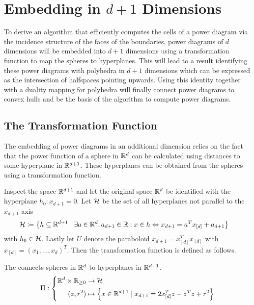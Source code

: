 \section{Embedding in \texorpdfstring{$d+1$}{d+1} Dimensions}
\label{sec:embedding_in_d_1_dimensions}
To derive an algorithm that efficiently computes the cells of a power diagram via the incidence structure of the faces of the boundaries, power diagrams of $d$ dimensions will be embedded into $d+1$ dimensions using a transformation function to map the spheres to hyperplanes.
This will lead to a result identifying these power diagrams with polyhedra in $d+1$ dimensions which can be expressed as the intersection of halfspaces pointing upwards.
Using this identity together with a duality mapping for polyhedra will finally connect power diagrams to convex hulls and be the basis of the algorithm to compute power diagrams.

\subsection{The Transformation Function}
\label{sub:the_transform}
The embedding of power diagrams in an additional dimension relies on the fact that the power function of a sphere in $\mathbb{R}^d$ can be calculated using distances to some hyperplane in $\mathbb{R}^{d+1}$.
These hyperplanes can be obtained from the spheres using a transformation function.

Inspect the space $\mathbb{R}^{d+1}$ and let the original space $\mathbb{R}^d$ be identified with the hyperplane $h_0: x_{d+1} = 0$.
Let $\mathcal{H}$ be the set of all hyperplanes not parallel to the $x_{d+1}$ axis
\begin{align}
    \mathcal{H} &\coloneqq \left\{ h \subseteq \mathbb{R}^{d+1} \mid \exists a \in \mathbb{R}^d, a_{d+1} \in \mathbb{R} : x \in h \Leftrightarrow x_{d+1} = a^Tx_{[d]} + a_{d+1} \right\}
\end{align}
with $h_0 \in \mathcal{H}$.
Lastly let $U$ denote the paraboloid $x_{d+1} = x_{[d]}^Tx_{[d]}$ with $x_{[d]} = \left( x_1, \dots, x_d \right)^T$.
Then the transformation function is defined as follows.

\begin{definition}
    The  connects spheres in $\mathbb{R}^d$ to hyperplanes in $\mathbb{R}^{d+1}$.
    \begin{align}
        \Pi: \left\{\begin{aligned}
            \mathbb{R}^{d} \times \mathbb{R}_{\geq 0} &\to \mathcal{H}\\
            (z, r^2) &\mapsto \left\{ x \in \mathbb{R}^{d+1} \mid x_{d+1} = 2x_{[d]}^Tz - z^Tz + r^2 \right\}
        \end{aligned}\right.
    \end{align}
\end{definition}

